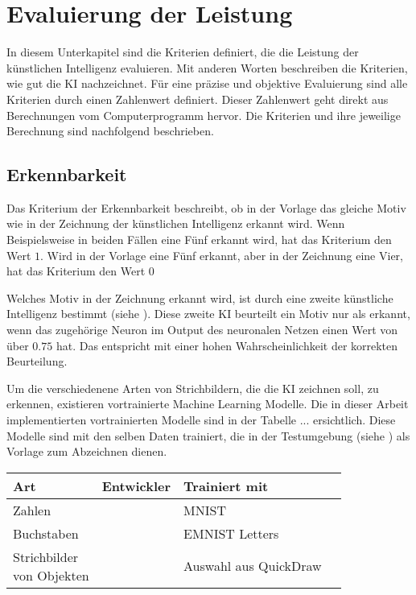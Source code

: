 \section{Evaluierung der Leistung}\label{chap:m_eval}
In diesem Unterkapitel sind die Kriterien definiert, die die Leistung der
künstlichen Intelligenz evaluieren. Mit anderen Worten beschreiben die
Kriterien, wie gut die KI nachzeichnet. Für eine präzise und objektive
Evaluierung sind alle Kriterien durch einen Zahlenwert definiert. Dieser
Zahlenwert geht direkt aus Berechnungen vom Computerprogramm hervor. Die
Kriterien und ihre jeweilige Berechnung sind nachfolgend beschrieben.

\subsection{Erkennbarkeit}\label{sub:m_eval_rec}
Das Kriterium der Erkennbarkeit beschreibt, ob in der Vorlage das gleiche Motiv
wie in der Zeichnung der künstlichen Intelligenz erkannt wird. Wenn
Beispielsweise in beiden Fällen eine Fünf erkannt wird, hat das Kriterium den
Wert $1$. Wird in der Vorlage eine Fünf erkannt, aber in der Zeichnung eine
Vier, hat das Kriterium den Wert $0$

Welches Motiv in der Zeichnung erkannt wird, ist durch eine zweite künstliche
Intelligenz bestimmt (siehe ). Diese zweite KI beurteilt
ein Motiv nur als erkannt, wenn das zugehörige Neuron im Output des neuronalen
Netzen einen Wert von über $0.75$ hat. Das entspricht mit einer hohen
Wahrscheinlichkeit der korrekten Beurteilung.

Um die verschiedenene Arten von Strichbildern, die die KI zeichnen soll, zu
erkennen, existieren vortrainierte Machine Learning Modelle. Die in dieser
Arbeit implementierten vortrainierten Modelle sind in der Tabelle {...}
ersichtlich. Diese Modelle sind mit den selben Daten trainiert, die in der
Testumgebung (siehe ) als Vorlage zum Abzeichnen
dienen.

\label{tab:Datasets}
\begin{table}[!ht]
  \centering
  \begin{tabular}{|l|l|l|l|}
  \hline
      Art & Entwickler & Trainiert mit \\ \hline
      Zahlen & \cite{mazzia__2022} & MNIST \\ \hline
      Buchstaben & \cite{mor_emnist_2022} & EMNIST Letters \\ \hline
      \makecell{Strichbilder\\von Objekten} & \cite{lam_linus_keras_2022} & Auswahl aus QuickDraw \\ \hline
  \end{tabular}
\end{table}

